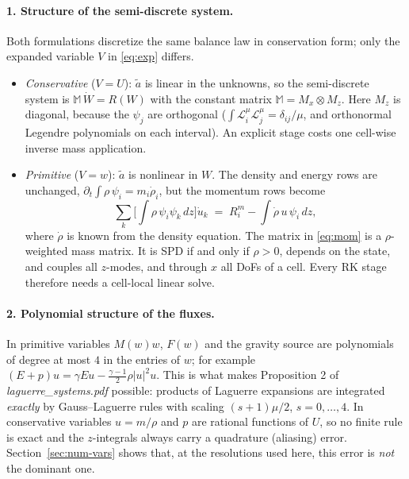 \documentclass[11pt,a4paper]{article}
\newcommand{\Lag}{\mathscr{L}}
\begin{document}
\paragraph{1. Structure of the semi-discrete system.}
Both formulations discretize the same balance law in conservation form; only the
expanded variable $V$ in \eqref{eq:exp} differs.
\begin{itemize}
\item \emph{Conservative} ($V=U$): $\tilde a$ is linear in the unknowns, so the
  semi-discrete system is $\mathbb M\,\dot W=R(W)$ with the constant matrix
  $\mathbb M=M_x\otimes M_z$. Here $M_z$ is diagonal, because the $\psi_j$ are
  orthogonal ($\int\Lag_i^\mu\Lag_j^\mu=\delta_{ij}/\mu$, and orthonormal Legendre
  polynomials on each interval). An explicit stage costs one cell-wise inverse mass
  application.
\item \emph{Primitive} ($V=w$): $\tilde a$ is nonlinear in $W$. The density and
  energy rows are unchanged, $\partial_t\int\rho\,\psi_i=m_i\dot\rho_i$, but the
  momentum rows become
  \begin{equation}\label{eq:mom}
  \sum_k\Big[\int\rho\,\psi_i\psi_k\,dz\Big]\dot u_k
  \;=\;R^m_i-\int\dot\rho\,u\,\psi_i\,dz ,
  \end{equation}
  where $\dot\rho$ is known from the density equation. The matrix in \eqref{eq:mom}
  is a $\rho$-weighted mass matrix. It is SPD if and only if $\rho>0$, depends on the
  state, and couples all $z$-modes, and through $x$ all DoFs of a cell. Every RK
  stage therefore needs a cell-local linear solve.
\end{itemize}

\paragraph{2. Polynomial structure of the fluxes.}
In primitive variables $M(w)w$, $F(w)$ and the gravity source are polynomials of
degree at most $4$ in the entries of $w$; for example $(E+p)u=\gamma Eu-\tfrac{\gamma-1}{2}\rho|u|^2u$.
This is what makes Proposition 2 of \emph{laguerre\_systems.pdf} possible: products of Laguerre
expansions are integrated \emph{exactly} by Gauss--Laguerre rules with scaling
$(s+1)\mu/2$, $s=0,\dots,4$. In conservative variables $u=m/\rho$ and $p$ are
rational functions of $U$, so no finite rule is exact and the $z$-integrals always
carry a quadrature (aliasing) error. Section~\ref{sec:num-vars} shows that, at the
resolutions used here, this error is \emph{not} the dominant one.
\end{document}

